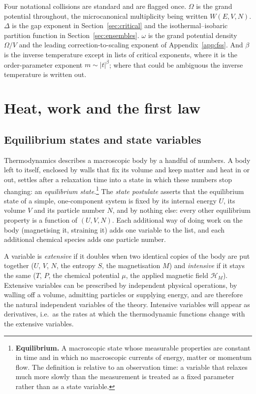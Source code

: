 \documentclass[10pt,a4paper]{article}
\theoremstyle{remark}
\newcommand{\hmag}{\mathcal{H}_M}
\begin{document}
Four notational collisions are standard and are flagged once. $\Omega$ is the
grand potential throughout, the microcanonical multiplicity being written
$W(E,V,N)$. $\Delta$ is the gap exponent in Section~\ref{sec:critical} and the
isothermal--isobaric partition function in Section~\ref{sec:ensembles}.
$\omega$ is the grand potential density $\Omega/V$ and the leading
correction-to-scaling exponent of Appendix~\ref{app:fss}. And $\beta$ is the
inverse temperature except in lists of critical exponents, where it is the
order-parameter exponent $m\sim|t|^{\beta}$; where that could be ambiguous the
inverse temperature is written out.

\section{Heat, work and the first law}
\label{sec:heat}

\subsection{Equilibrium states and state variables}
\label{sec:states}

Thermodynamics describes a macroscopic body by a handful of numbers. A body
left to itself, enclosed by walls that fix its volume and keep matter and heat
in or out, settles after a relaxation time into a state in which these numbers
stop changing: an \emph{equilibrium state}.\footnote{\label{fn:equilibrium}%
\textbf{Equilibrium.} A macroscopic state whose measurable properties are
constant in time and in which no macroscopic currents of energy, matter or
momentum flow. The definition is relative to an observation time: a variable
that relaxes much more slowly than the measurement is treated as a fixed
parameter rather than as a state variable.}
The \emph{state postulate} asserts that the equilibrium state of a simple,
one-component system is fixed by its internal energy $U$, its volume $V$ and
its particle number $N$, and by nothing else: every other equilibrium property
is a function of $(U,V,N)$. Each additional way of doing work on the body
(magnetising it, straining it) adds one variable to the list, and each
additional chemical species adds one particle number.

A variable is \emph{extensive} if it doubles when two identical copies of the
body are put together ($U$, $V$, $N$, the entropy $S$, the magnetisation $M$)
and \emph{intensive} if it stays the same ($T$, $P$, the chemical potential
$\mu$, the applied magnetic field $\hmag{}$). Extensive variables can be prescribed by
independent physical operations, by walling off a volume, admitting particles
or supplying energy, and are therefore the natural independent variables of the
theory. Intensive variables will appear as derivatives, i.e.\ as the rates at which
the thermodynamic functions change with the extensive variables.
\end{document}

